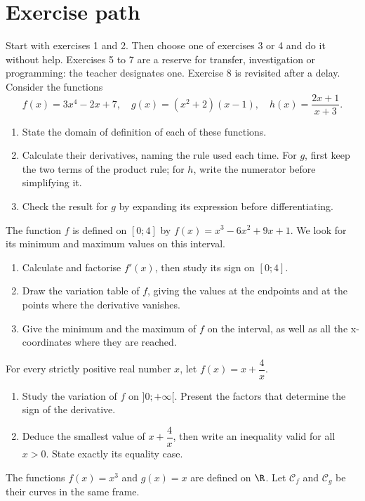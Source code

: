 \section*{Exercise path}\label{C06-PARC}
Start with exercises 1 and 2. Then choose one of exercises 3 or 4 and do it without help. Exercises 5 to 7 are a reserve for transfer, investigation or programming: the teacher designates one. Exercise 8 is revisited after a delay.
\begingroup
{}
Consider the functions\[f(x)=3x^4-2x+7,\quad g(x)=(x^2+2)(x-1),\quad h(x)=\dfrac{2x+1}{x+3}.\]
\begin{enumerate}[label=\arabic*.]
\item State the domain of definition of each of these functions.
\item Calculate their derivatives, naming the rule used each time. For $g$, first keep the two terms of the product rule; for $h$, write the numerator before simplifying it.
\item Check the result for $g$ by expanding its expression before differentiating.
\end{enumerate}
The function $f$ is defined on $[0;4]$ by $f(x)=x^3-6x^2+9x+1$. We look for its minimum and maximum values on this interval.
\begin{enumerate}[label=\arabic*.]
\item Calculate and factorise $f\prime(x)$, then study its sign on $[0;4]$.
\item Draw the variation table of $f$, giving the values at the endpoints and at the points where the derivative vanishes.
\item Give the minimum and the maximum of $f$ on the interval, as well as all the x-coordinates where they are reached.
\end{enumerate}
For every strictly positive real number $x$, let $f(x)=x+\dfrac4x$.
\begin{enumerate}[label=\arabic*.]
\item Study the variation of $f$ on $]0;+\infty[$. Present the factors that determine the sign of the derivative.
\item Deduce the smallest value of $x+\dfrac4x$, then write an inequality valid for all $x>0$. State exactly its equality case.
\end{enumerate}
The functions $f(x)=x^3$ and $g(x)=x$ are defined on $\R$. Let $\mathcal C_f$ and $\mathcal C_g$ be their curves in the same frame.
